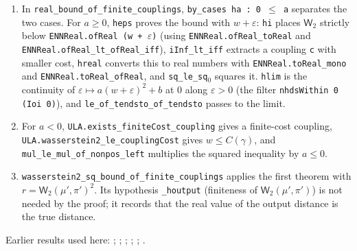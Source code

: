 \documentclass[11pt,a4paper]{report}
\begin{document}
\begin{leanbox}
\begin{enumerate}


\item In \texttt{real\_\allowbreak{}bound\_\allowbreak{}of\_\allowbreak{}finite\_\allowbreak{}couplings}, \texttt{by\_\allowbreak{}cases ha : 0 \ensuremath{\le} a} separates the two cases. For \(a\ge0\), \texttt{heps} proves the bound with \(w+\varepsilon\): \texttt{hi} places \(\mathsf W_2\) strictly below \texttt{ENNReal.\allowbreak{}of\allowbreak{}Real (w + \ensuremath{\varepsilon})} (using \texttt{ENNReal.\allowbreak{}of\allowbreak{}Real\_\allowbreak{}to\allowbreak{}Real} and \texttt{ENNReal.\allowbreak{}of\allowbreak{}Real\_\allowbreak{}lt\_\allowbreak{}of\allowbreak{}Real\_\allowbreak{}iff}), \texttt{i\allowbreak{}Inf\_\allowbreak{}lt\_\allowbreak{}iff} extracts a coupling \texttt{c} with smaller cost, \texttt{hreal} converts this to real numbers with \texttt{ENNReal.\allowbreak{}to\allowbreak{}Real\_\allowbreak{}mono} and \texttt{ENNReal.\allowbreak{}to\allowbreak{}Real\_\allowbreak{}of\allowbreak{}Real}, and \texttt{sq\_\allowbreak{}le\_\allowbreak{}sq\ensuremath{{}_{0}}} squares it. \texttt{hlim} is the continuity of \(\varepsilon\mapsto a(w+\varepsilon)^2+b\) at \(0\) along \(\varepsilon>0\) (the filter \texttt{nhds\allowbreak{}Within 0 (Ioi 0)}), and \texttt{le\_\allowbreak{}of\_\allowbreak{}tendsto\_\allowbreak{}of\_\allowbreak{}tendsto} passes to the limit.

\item For \(a<0\), \texttt{ULA.\allowbreak{}exists\_\allowbreak{}finite\allowbreak{}Cost\_\allowbreak{}coupling} gives a finite-cost coupling, \texttt{ULA.\allowbreak{}wasserstein2\_\allowbreak{}le\_\allowbreak{}coupling\allowbreak{}Cost} gives \(w\le C(\gamma)\), and \texttt{mul\_\allowbreak{}le\_\allowbreak{}mul\_\allowbreak{}of\_\allowbreak{}nonpos\_\allowbreak{}left} multiplies the squared inequality by \(a\le0\).

\item \texttt{wasserstein2\_\allowbreak{}sq\_\allowbreak{}bound\_\allowbreak{}of\_\allowbreak{}finite\_\allowbreak{}couplings} applies the first theorem with \(r=\mathsf W_2(\mu',\pi')^2\). Its hypothesis \texttt{\_\allowbreak{}houtput} (finiteness of \(\mathsf W_2(\mu',\pi')\)) is not needed by the proof; it records that the real value of the output distance is the true distance.

\end{enumerate}
\end{leanbox}


Earlier results used here: \cite[Section~3.17.1]{LangevinLean2026ULASC}; \cite[Section~3.17.2]{LangevinLean2026ULASC}; \cite[Section~3.17.3]{LangevinLean2026ULASC}; \cite[Section~3.17.4]{LangevinLean2026ULASC}; \cite[Section~3.17.5]{LangevinLean2026ULASC}; \cite[Section~3.18.2]{LangevinLean2026ULASC}.
\end{document}
